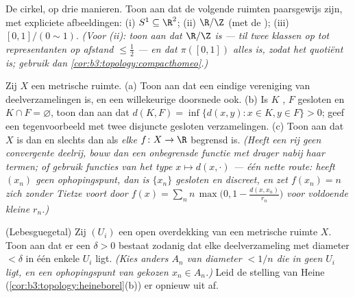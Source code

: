 \begin{exercise}[$\star\star$]\label{exo:b3:topology:5}
De cirkel, op drie manieren. Toon aan dat de volgende ruimten
paarsgewijs  zijn, met expliciete afbeeldingen: (i) $S^1
\subseteq \R^2$; (ii) $\R/\Z$ (met de ); (iii)
$[0,1]/(0 \sim 1)$. \emph{(Voor (ii): toon aan dat $\R/\Z$
 is --- til twee klassen op tot representanten op afstand
$\leq \frac12$ --- en dat $\pi([0,1])$ alles is, zodat het
quotiënt  is; gebruik dan
\cref{cor:b3:topology:compacthomeo}.)}
\end{exercise}

\begin{exercise}[$\star\star$]\label{exo:b3:topology:6}
Zij $X$ een metrische ruimte.
(a) Toon aan dat een eindige vereniging van 
deelverzamelingen  is, en een willekeurige doorsnede ook.
(b) Is $K$ , $F$ gesloten en $K \cap F = \varnothing$, toon
dan aan dat $d(K, F) = \inf\{d(x,y) : x \in K, y \in F\} > 0$;
geef een tegenvoorbeeld met twee disjuncte gesloten
verzamelingen.
(c) Toon aan dat $X$  is dan en slechts dan als
\emph{elke}  $f \colon X \to \R$ begrensd is. \emph{(Heeft
een rij geen convergente deelrij, bouw dan een onbegrensde
 functie met drager nabij haar termen; of gebruik functies
van het type $x \mapsto d(x, \cdot)$ --- één nette route: heeft
$(x_n)$ geen ophopingspunt, dan is $\{x_n\}$ gesloten en discreet,
en zet $f(x_n) = n$ zich zonder Tietze  voort door $f(x) =
\sum_n n\,\max\bigl(0, 1 - \frac{d(x, x_n)}{r_n}\bigr)$ voor
voldoende kleine $r_n$.)}
\end{exercise}

\begin{exercise}[$\star\star$]\label{exo:b3:topology:7}
(Lebesguegetal) Zij $(U_i)$ een open overdekking van een 
metrische ruimte $X$. Toon aan dat er een $\delta > 0$ bestaat
zodanig dat elke deelverzameling met diameter $< \delta$ in één
enkele $U_i$ ligt. \emph{(Kies anders $A_n$ van diameter $< 1/n$
die in geen $U_i$ ligt, en een ophopingspunt van gekozen $x_n \in
A_n$.)} Leid de stelling van Heine
(\cref{cor:b3:topology:heineborel}(b)) er opnieuw uit af.
\end{exercise}


